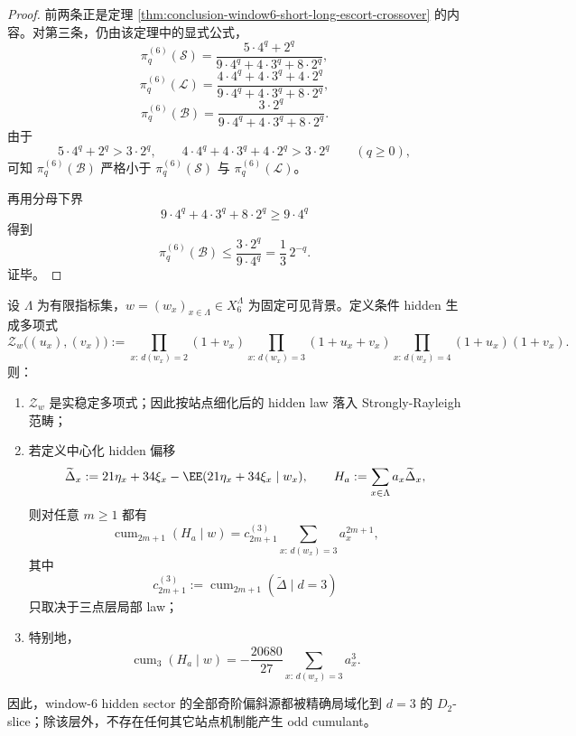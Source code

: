 \begin{proof}
前两条正是定理 \ref{thm:conclusion-window6-short-long-escort-crossover} 的内容。对第三条，仍由该定理中的显式公式，
\[
\pi_q^{(6)}(\mathcal S)
=
\frac{5\cdot 4^q+2^q}{9\cdot 4^q+4\cdot 3^q+8\cdot 2^q},
\]
\[
\pi_q^{(6)}(\mathcal L)
=
\frac{4\cdot 4^q+4\cdot 3^q+4\cdot 2^q}{9\cdot 4^q+4\cdot 3^q+8\cdot 2^q},
\]
\[
\pi_q^{(6)}(\mathcal B)
=
\frac{3\cdot 2^q}{9\cdot 4^q+4\cdot 3^q+8\cdot 2^q}.
\]
由于
\[
5\cdot 4^q+2^q>3\cdot 2^q,
\qquad
4\cdot 4^q+4\cdot 3^q+4\cdot 2^q>3\cdot 2^q
\qquad(q\ge 0),
\]
可知 \(\pi_q^{(6)}(\mathcal B)\) 严格小于 \(\pi_q^{(6)}(\mathcal S)\) 与 \(\pi_q^{(6)}(\mathcal L)\)。

再用分母下界
\[
9\cdot 4^q+4\cdot 3^q+8\cdot 2^q\ge 9\cdot 4^q
\]
得到
\[
\pi_q^{(6)}(\mathcal B)
\le
\frac{3\cdot 2^q}{9\cdot 4^q}
=
\frac13\,2^{-q}.
\]
证毕。
\end{proof}
\begin{theorem}\label{thm:conclusion-window6-hidden-realstable-d2slice-odd-cumulant-localization}
设 \(\Lambda\) 为有限指标集，\(w=(w_x)_{x\in\Lambda}\in X_6^\Lambda\) 为固定可见背景。定义条件 hidden 生成多项式
\[
\mathscr Z_w\bigl((u_x),(v_x)\bigr)
:=
\prod_{x:\,d(w_x)=2}(1+v_x)
\prod_{x:\,d(w_x)=3}(1+u_x+v_x)
\prod_{x:\,d(w_x)=4}(1+u_x)(1+v_x).
\]
则：
\begin{enumerate}
  \item \(\mathscr Z_w\) 是实稳定多项式；因此按站点细化后的 hidden law 落入 Strongly-Rayleigh 范畴；
  \item 若定义中心化 hidden 偏移
  \[
  \widetilde\Delta_x
  :=
  21\eta_x+34\xi_x-\EE(21\eta_x+34\xi_x\mid w_x),
  \qquad
  H_a:=\sum_{x\in\Lambda}a_x\widetilde\Delta_x,
  \]
  则对任意 \(m\ge 1\) 都有
  \[
  \operatorname{cum}_{2m+1}(H_a\mid w)
  =
  c_{2m+1}^{(3)}
  \sum_{x:\,d(w_x)=3} a_x^{2m+1},
  \]
  其中
  \[
  c_{2m+1}^{(3)}:=\operatorname{cum}_{2m+1}(\widetilde\Delta\mid d=3)
  \]
  只取决于三点层局部 law；
  \item 特别地，
  \[
  \operatorname{cum}_3(H_a\mid w)
  =
  -\frac{20680}{27}\sum_{x:\,d(w_x)=3} a_x^3.
  \]
\end{enumerate}
因此，window-\(6\) hidden sector 的全部奇阶偏斜源都被精确局域化到 \(d=3\) 的 \(D_2\)-slice；除该层外，不存在任何其它站点机制能产生 odd cumulant。
\end{theorem}
